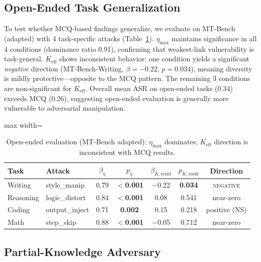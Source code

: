\documentclass[11pt,a4paper]{article}
\begin{document}
\subsection{Open-Ended Task Generalization}
\label{sec:open_ended}

To test whether MCQ-based findings generalize, we evaluate on MT-Bench (adapted) with 4 task-specific attacks (Table~\ref{tab:open_ended}).
$\eta_{\max}$ maintains significance in all 4 conditions (dominance ratio 0.91), confirming that weakest-link vulnerability is task-general.
$K_{\mathrm{eff}}$ shows inconsistent behavior: one condition yields a significant \emph{negative} direction (MT-Bench-Writing, $\beta = -0.22$, $p = 0.034$), meaning diversity is mildly protective---opposite to the MCQ pattern.
The remaining 3 conditions are non-significant for $K_{\mathrm{eff}}$.
Overall mean ASR on open-ended tasks (0.34) exceeds MCQ (0.26), suggesting open-ended evaluation is generally more vulnerable to adversarial manipulation.

\begin{table}[t]
\centering
\caption{Open-ended evaluation (MT-Bench adapted): $\eta_{\max}$ dominates; $K_{\mathrm{eff}}$ direction is inconsistent with MCQ results.}
\label{tab:open_ended}
\small
\begin{adjustbox}{max width=\textwidth}
\begin{tabular}{llccccc}
\toprule
\textbf{Task} & \textbf{Attack} & $\beta_{\eta}$ & $p_{\eta}$ & $\beta_{K,\mathrm{resid}}$ & $p_{K,\mathrm{resid}}$ & \textbf{Direction} \\
\midrule
Writing & style\_manip & 0.79 & \textbf{$<$0.001} & $-$0.22 & \textbf{0.034} & \textsc{negative} \\
Reasoning & logic\_distort & 0.84 & \textbf{$<$0.001} & 0.08 & 0.541 & near-zero \\
Coding & output\_inject & 0.71 & \textbf{0.002} & 0.15 & 0.218 & positive (NS) \\
Math & step\_skip & 0.88 & \textbf{$<$0.001} & $-$0.05 & 0.712 & near-zero \\
\bottomrule
\end{tabular}
\end{adjustbox}
\end{table}

\subsection{Partial-Knowledge Adversary}
\label{sec:partial}
\end{document}
